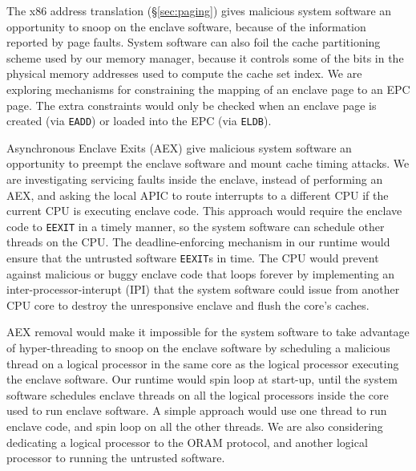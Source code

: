 The x86 address translation (\S \ref{sec:paging}) gives malicious system
software an opportunity to snoop on the enclave software, because of the
information reported by page faults. System software can also foil the cache
partitioning scheme used by our memory manager, because it controls some of the
bits in the physical memory addresses used to compute the cache set index. We
are exploring mechanisms for constraining the mapping of an enclave page to an
EPC page. The extra constraints would only be checked when an enclave page is
created (via \texttt{EADD}) or loaded into the EPC (via \texttt{ELDB}).

Asynchronous Enclave Exits (AEX) give malicious system software an opportunity
to preempt the enclave software and mount cache timing attacks. We are
investigating servicing faults inside the enclave, instead of performing an
AEX, and asking the local APIC to route interrupts to a different CPU if the
current CPU is executing enclave code. This approach would require the enclave
code to \texttt{EEXIT} in a timely manner, so the system software can schedule
other threads on the CPU. The deadline-enforcing mechanism in our runtime would
ensure that the untrusted software \texttt{EEXIT}s in time. The CPU would
prevent against malicious or buggy enclave code that loops forever by
implementing an inter-processor-interupt (IPI) that the system software could
issue from another CPU core to destroy the unresponsive enclave and flush the
core's caches.

AEX removal would make it impossible for the system software to take advantage
of hyper-threading to snoop on the enclave software by scheduling a malicious
thread on a logical processor in the same core as the logical processor
executing the enclave software. Our runtime would spin loop at start-up, until
the system software schedules enclave threads on all the logical processors
inside the core used to run enclave software. A simple approach would use one
thread to run enclave code, and spin loop on all the other threads. We are
also considering dedicating a logical processor to the ORAM protocol, and
another logical processor to running the untrusted software.
